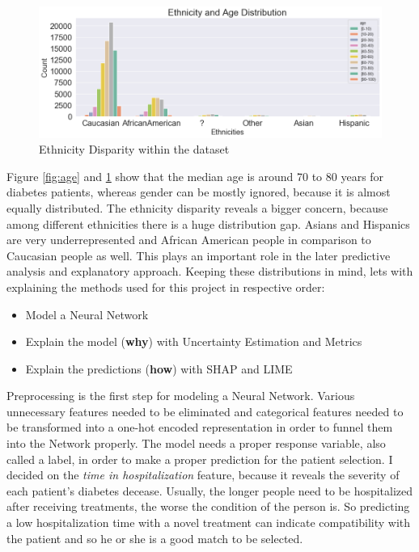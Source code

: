 \documentclass[journal]{IEEEtran}
\begin{document}
\begin{figure}
	\centering
		\includegraphics[width=1\linewidth]{../imgs/ethnicities_new}
	\caption{Ethnicity Disparity within the dataset}
	\label{fig:eth}
\end{figure}

Figure \ref{fig:age} and \ref{fig:eth} show that the median age is around 70 to 80 years for diabetes patients, whereas gender can be mostly ignored, because it is almost equally distributed. The ethnicity disparity reveals a bigger concern, because among different ethnicities there is a huge distribution gap. Asians and Hispanics are very underrepresented and African American people in comparison to Caucasian people as well. This plays an important role in the later predictive analysis and explanatory approach. Keeping these distributions in mind, lets with explaining the methods used for this project in respective order:  \\

\begin{itemize}
	\item Model a Neural Network 
	\item Explain the model (\textbf{why}) with Uncertainty Estimation and Metrics
	\item Explain the predictions (\textbf{how}) with SHAP and LIME \\
\end{itemize}


Preprocessing is the first step for modeling a Neural Network. Various unnecessary features needed to be eliminated and categorical features needed to be transformed into a one-hot encoded representation in order to funnel them into the Network properly. The model needs a proper response variable, also called a label, in order to make a proper prediction for the patient selection. I decided on the \textit{time in hospitalization} feature, because it reveals the severity of each patient's diabetes decease. Usually, the longer people need to be hospitalized after receiving treatments, the worse the condition of the person is. So predicting a low hospitalization time with a novel treatment can indicate compatibility with the patient and so he or she is a good match to be selected. 
\end{document}

